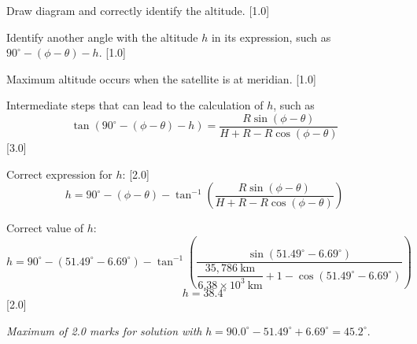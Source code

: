 Draw diagram and correctly identify the altitude. \hfill[1.0]

Identify another angle with the altitude $h$ in its expression, such as
$90^\circ - (\phi - \theta) - h$. \hfill[1.0]

Maximum altitude occurs when the satellite is at meridian. \hfill[1.0]

Intermediate steps that can lead to the calculation of $h$, such as
\[ \tan(90^\circ - (\phi - \theta) - h)
   = \frac{R\sin(\phi - \theta)}{H + R - R\cos(\phi - \theta)} \]
\hfill[3.0]

Correct expression for $h$: \hfill[2.0]
\[ h = 90^\circ - (\phi - \theta)
   - \tan^{-1}\left(\frac{R\sin(\phi - \theta)}
                        {H + R - R\cos(\phi - \theta)}\right) \]

Correct value of $h$:
\[ h = 90^\circ - (51.49^\circ - 6.69^\circ)
   - \tan^{-1}\left(\frac{\sin(51.49^\circ - 6.69^\circ)}
     {\dfrac{35{,}786\ \mathrm{km}}{6.38\times 10^{3}\ \mathrm{km}}
      + 1 - \cos(51.49^\circ - 6.69^\circ)}\right) \]
\[ h = 38.4^\circ \]
\hfill[2.0]

\emph{Maximum of 2.0 marks for solution with}
$h = 90.0^\circ - 51.49^\circ + 6.69^\circ = 45.2^\circ$.
